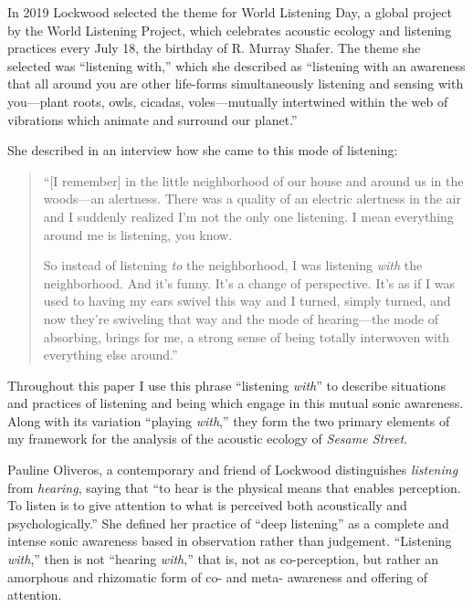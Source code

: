 \documentclass[12pt,letterpaper]{article}
\begin{document}
	In 2019 Lockwood selected the theme for World Listening Day, a global
	project by the World Listening Project, which celebrates acoustic 
	ecology and listening practices every July 18, the birthday of R. 
	Murray Shafer. The theme she selected was ``listening with,'' which she
	described as ``listening with an awareness that all around you are other
	life-forms simultaneously listening and sensing with you---plant roots,
	owls, cicadas, voles---mutually intertwined within the web of vibrations
	which animate and surround our planet.''\autocite{WLP}  

	She described in an interview how she came to this mode of listening:
	
	\begin{quote}
	\singlespacing

	``[I remember] in the little neighborhood of our house and around us 
	in the 
	woods---an alertness. There was a quality of an electric alertness in 
	the air and I suddenly realized I'm not the only one listening. I mean 
	everything around me is listening, you know.
	
	So instead of listening \textit{to} the neighborhood, I was listening 
	\textit{with} the neighborhood. And it's funny. It's a change of 
	perspective. It's as if I was used to having my ears swivel this way and
	I turned, simply turned, and now they're swiveling that way and the mode
	of hearing---the mode of absorbing, brings for me, a strong sense of 
	being totally interwoven with everything else 
	around.''\autocite{WLPVimeo} 
	
	\end{quote}
	\doublespacing

	Throughout this paper I use this phrase ``listening \textit{with}'' to
	describe situations and practices of listening and being which
	engage in this mutual sonic awareness. Along with its variation 
	``playing \textit{with},'' they form the two primary elements of my
	framework for the analysis of the acoustic ecology of 
	\textit{Sesame Street}. 

	Pauline Oliveros, a contemporary and friend of 
	Lockwood\autocite[116]{Rodgers}  distinguishes \textit{listening} from 
	\textit{hearing}, saying that ``to hear is the physical means that 
	enables perception.
	To listen is to give attention to what is perceived both acoustically 
	and psychologically.'' She defined her practice of ``deep listening''
	as a complete and intense sonic awareness based in observation
	rather than judgement. \autocite[33/366, As things stand today, e-books
	are basically useless for academic research because they lack, of all
	things, page numbers. At its bare-bones, a synthetic work like this
	methodology section is just a long list of page numbers, which makes 
	my reading habbits slightly unhealthy. I'm going to go back and find
	the page numbers in the hard cover edition, but for now, I will list
	them as fractions.]{Odell}  
	``Listening \textit{with},'' then is not ``hearing \textit{with},'' 
	that is, not as co-perception, but rather an amorphous and rhizomatic
	form of co- and meta- awareness and offering of attention.  
\end{document}
